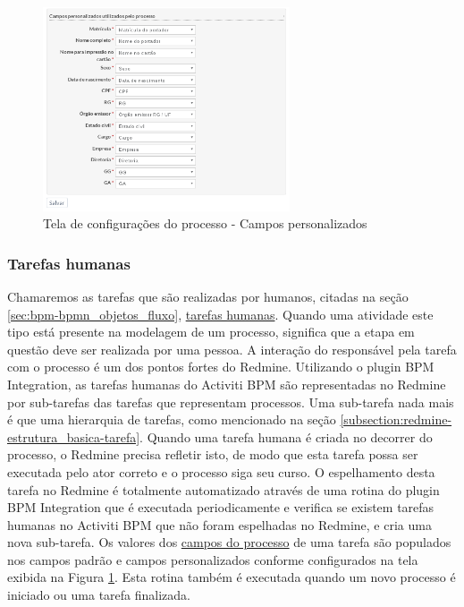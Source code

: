 \begin{figure}[H]
\centering
\includegraphics[width=0.65\textwidth]{imagens/plugin_process_settings2.png}
\caption{Tela de configurações do processo - Campos personalizados}
\label{fig:plugin_process_settings}
\end{figure}

\subsubsection{Tarefas humanas}\label{sec:integracao_redmine_activiti_sincronizacao-criacao_human_task}

Chamaremos as tarefas que são realizadas por humanos, citadas na seção \ref{sec:bpm-bpmn_objetos_fluxo}, \underline{tarefas humanas}. Quando uma atividade este tipo está presente na modelagem de um processo, significa que a etapa em questão deve ser realizada por uma pessoa. A interação do responsável pela tarefa com o processo é um dos pontos fortes do Redmine. Utilizando o plugin BPM Integration, as tarefas humanas do Activiti BPM são representadas no Redmine por sub-tarefas das tarefas que representam processos. Uma sub-tarefa nada mais é que uma hierarquia de tarefas, como mencionado na seção \ref{subsection:redmine-estrutura_basica-tarefa}.
Quando uma tarefa humana é criada no decorrer do processo, o Redmine precisa refletir isto, de modo que esta tarefa possa ser executada pelo ator correto e o processo siga seu curso. O espelhamento desta tarefa no Redmine é totalmente automatizado através de uma rotina do plugin BPM Integration que é executada periodicamente e verifica se existem tarefas humanas no Activiti BPM que não foram espelhadas no Redmine, e cria uma nova sub-tarefa. Os valores dos \underline{campos do processo} de uma tarefa são populados nos campos padrão e campos personalizados conforme configurados na tela exibida na Figura \ref{fig:plugin_process_settings}. Esta rotina também é executada quando um novo processo é iniciado ou uma tarefa finalizada.

